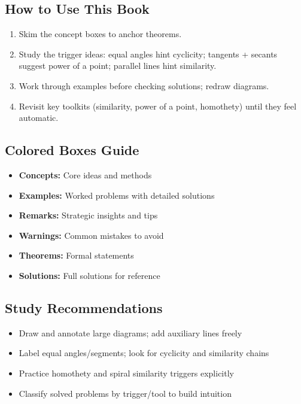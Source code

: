 ﻿\documentclass[12pt]{extarticle}
\begin{document}
\subsection*{How to Use This Book}
\begin{enumerate}
  \item Skim the concept boxes to anchor theorems.
  \item Study the trigger ideas: equal angles hint cyclicity; tangents + secants suggest power of a point; parallel lines hint similarity.
  \item Work through examples before checking solutions; redraw diagrams.
  \item Revisit key toolkits (similarity, power of a point, homothety) until they feel automatic.
\end{enumerate}

\subsection*{Colored Boxes Guide}
\begin{itemize}
  \item \textcolor{blue!75!black}{\textbf{Concepts:}} Core ideas and methods
  \item \textcolor{orange!75!black}{\textbf{Examples:}} Worked problems with detailed solutions
  \item \textcolor{green!60!black}{\textbf{Remarks:}} Strategic insights and tips
  \item \textcolor{red!75!black}{\textbf{Warnings:}} Common mistakes to avoid
  \item \textcolor{purple!75!black}{\textbf{Theorems:}} Formal statements
  \item \textcolor{yellow!80!black}{\textbf{Solutions:}} Full solutions for reference
\end{itemize}

\subsection*{Study Recommendations}
\begin{itemize}
  \item Draw and annotate large diagrams; add auxiliary lines freely
  \item Label equal angles/segments; look for cyclicity and similarity chains
  \item Practice homothety and spiral similarity triggers explicitly
  \item Classify solved problems by trigger/tool to build intuition
\end{itemize}
\end{document}
